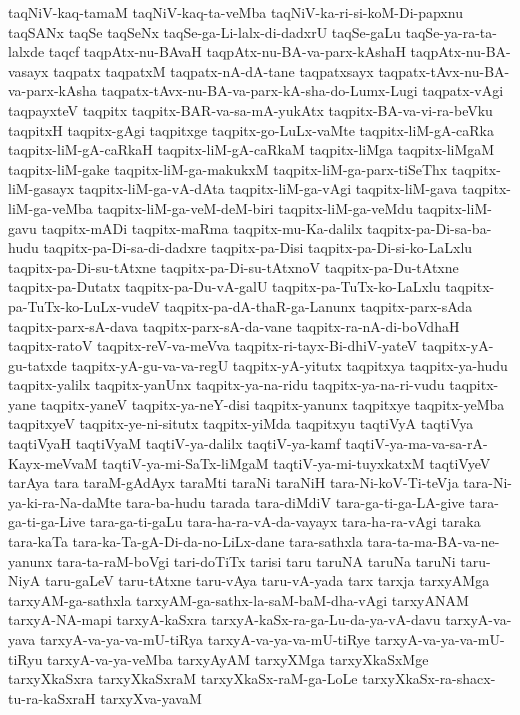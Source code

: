 {taqNiV-kaq-tamaM
taqNiV-kaq-ta-veMba
taqNiV-ka-ri-si-koM-Di-papxnu
taqSANx
taqSe
taqSeNx
taqSe-ga-Li-lalx-di-dadxrU
taqSe-gaLu
taqSe-ya-ra-ta-lalxde
taqcf
taqpAtx-nu-BAvaH
taqpAtx-nu-BA-va-parx-kAshaH
taqpAtx-nu-BA-vasayx
taqpatx
taqpatxM
taqpatx-nA-dA-tane
taqpatxsayx
taqpatx-tAvx-nu-BA-va-parx-kAsha
taqpatx-tAvx-nu-BA-va-parx-kA-sha-do-Lumx-Lugi
taqpatx-vAgi
taqpayxteV
taqpitx
taqpitx-BAR-va-sa-mA-yukAtx
taqpitx-BA-va-vi-ra-beVku
taqpitxH
taqpitx-gAgi
taqpitxge
taqpitx-go-LuLx-vaMte
taqpitx-liM-gA-caRka
taqpitx-liM-gA-caRkaH
taqpitx-liM-gA-caRkaM
taqpitx-liMga
taqpitx-liMgaM
taqpitx-liM-gake
taqpitx-liM-ga-makukxM
taqpitx-liM-ga-parx-tiSeThx
taqpitx-liM-gasayx
taqpitx-liM-ga-vA-dAta
taqpitx-liM-ga-vAgi
taqpitx-liM-gava
taqpitx-liM-ga-veMba
taqpitx-liM-ga-veM-deM-biri
taqpitx-liM-ga-veMdu
taqpitx-liM-gavu
taqpitx-mADi
taqpitx-maRma
taqpitx-mu-Ka-dalilx
taqpitx-pa-Di-sa-ba-hudu
taqpitx-pa-Di-sa-di-dadxre
taqpitx-pa-Disi
taqpitx-pa-Di-si-ko-LaLxlu
taqpitx-pa-Di-su-tAtxne
taqpitx-pa-Di-su-tAtxnoV
taqpitx-pa-Du-tAtxne
taqpitx-pa-Dutatx
taqpitx-pa-Du-vA-galU
taqpitx-pa-TuTx-ko-LaLxlu
taqpitx-pa-TuTx-ko-LuLx-vudeV
taqpitx-pa-dA-thaR-ga-Lanunx
taqpitx-parx-sAda
taqpitx-parx-sA-dava
taqpitx-parx-sA-da-vane
taqpitx-ra-nA-di-boVdhaH
taqpitx-ratoV
taqpitx-reV-va-meVva
taqpitx-ri-tayx-Bi-dhiV-yateV
taqpitx-yA-gu-tatxde
taqpitx-yA-gu-va-va-regU
taqpitx-yA-yitutx
taqpitxya
taqpitx-ya-hudu
taqpitx-yalilx
taqpitx-yanUnx
taqpitx-ya-na-ridu
taqpitx-ya-na-ri-vudu
taqpitx-yane
taqpitx-yaneV
taqpitx-ya-neY-disi
taqpitx-yanunx
taqpitxye
taqpitx-yeMba
taqpitxyeV
taqpitx-ye-ni-situtx
taqpitx-yiMda
taqpitxyu
taqtiVyA
taqtiVya
taqtiVyaH
taqtiVyaM
taqtiV-ya-dalilx
taqtiV-ya-kamf
taqtiV-ya-ma-va-sa-rA-Kayx-meVvaM
taqtiV-ya-mi-SaTx-liMgaM
taqtiV-ya-mi-tuyxkatxM
taqtiVyeV
tarAya
tara
taraM-gAdAyx
taraMti
taraNi
taraNiH
tara-Ni-koV-Ti-teVja
tara-Ni-ya-ki-ra-Na-daMte
tara-ba-hudu
tarada
tara-diMdiV
tara-ga-ti-ga-LA-give
tara-ga-ti-ga-Live
tara-ga-ti-gaLu
tara-ha-ra-vA-da-vayayx
tara-ha-ra-vAgi
taraka
tara-kaTa
tara-ka-Ta-gA-Di-da-no-LiLx-dane
tara-sathxla
tara-ta-ma-BA-va-ne-yanunx
tara-ta-raM-boVgi
tari-doTiTx
tarisi
taru
taruNA
taruNa
taruNi
taru-NiyA
taru-gaLeV
taru-tAtxne
taru-vAya
taru-vA-yada
tarx
tarxja
tarxyAMga
tarxyAM-ga-sathxla
tarxyAM-ga-sathx-la-saM-baM-dha-vAgi
tarxyANAM
tarxyA-NA-mapi
tarxyA-kaSxra
tarxyA-kaSx-ra-ga-Lu-da-ya-vA-davu
tarxyA-va-yava
tarxyA-va-ya-va-mU-tiRya
tarxyA-va-ya-va-mU-tiRye
tarxyA-va-ya-va-mU-tiRyu
tarxyA-va-ya-veMba
tarxyAyAM
tarxyXMga
tarxyXkaSxMge
tarxyXkaSxra
tarxyXkaSxraM
tarxyXkaSx-raM-ga-LoLe
tarxyXkaSx-ra-shacx-tu-ra-kaSxraH
tarxyXva-yavaM
}
